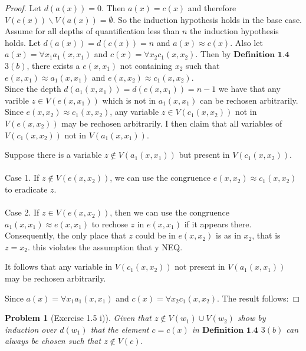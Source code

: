 \documentclass{article}
\theoremstyle{problemstyle}
\newtheorem{problem}{Problem}
\theoremstyle{lemmastyle}
\theoremstyle{theoremstyle}
\begin{document}
\begin{proof}
Let $d(a(x)) = 0$. Then $a(x) = c(x)$ and therefore $V(c(x))\backslash V(a(x)) = \emptyset$. So the induction hypothesis holds in the base case.\\ 

Assume for all depths of quantification less than $n$ the induction hypothesis holds. Let $d(a(x)) = d(c(x)) = n$ and $a(x) \approx c(x)$. Also let $a(x) = \forall x_1 a_1(x,x_1)$ and $c(x) = \forall x_2 c_1(x,x_2)$. Then by $\textbf{Definition 1.4}$ $3 (b)$, there exists a $e(x,x_1)$ not containing $x_2$ such that $e(x,x_1) \approx a_1(x,x_1)$ and  $e(x,x_2) \approx c_1(x,x_2)$.\\

Since  the depth $d(a_1(x,x_1)) = d(e(x,x_1)) = n-1$ we have that any varible $z \in V(e(x,x_1))$ which is not in $a_1(x,x_1)$ can be rechosen arbitrarily. Since $e(x,x_2) \approx c_1(x,x_2)$, any variable $z \in V(c_1(x,x_2))$ not in $V(e(x,x_2))$ may be rechosen arbitrarily. I then claim that all variables of $V(c_1(x,x_2))$ not in $V(a_1(x,x_1))$. 

% 

Suppose there is a variable $z \notin V(a_1(x,x_1))$ but present in $V(c_1(x,x_2))$.\\\\ Case 1. If $z \notin V(e(x,x_2))$, we can use the congruence $e(x,x_2) \approx c_1(x,x_2)$ to eradicate $z$.\\\\  Case 2. If $z \in V(e(x,x_2))$, then we can use the congruence $a_1(x,x_1) \approx e(x,x_1)$ to rechose $z$ in $e(x,x_1)$ if it appears there.  Consequently, the only place that $z$ could be in $e(x,x_2)$ is as in $x_2$, that is $z = x_2$.  this violates the assumption that y NEQ. 

It follows that any variable in $V(c_1(x,x_2))$ not present in $V(a_1(x,x_1))$ may be rechosen arbitrarily.

Since $a(x) = \forall x_1 a_1(x,x_1)$ and $c(x) = \forall x_2 c_1(x,x_2)$. The result follows: 
\end{proof}

\begin{problem}[Exercise 1.5 i)]
Given that $z \notin V(w_1) \cup V(w_2)$ show by induction over $d(w_1)$ that the element $c = c(x)$ in $\textbf{Definition 1.4}$ $3 (b)$ can always be chosen such that $z \notin V(c).$
\end{problem}
\end{document}
